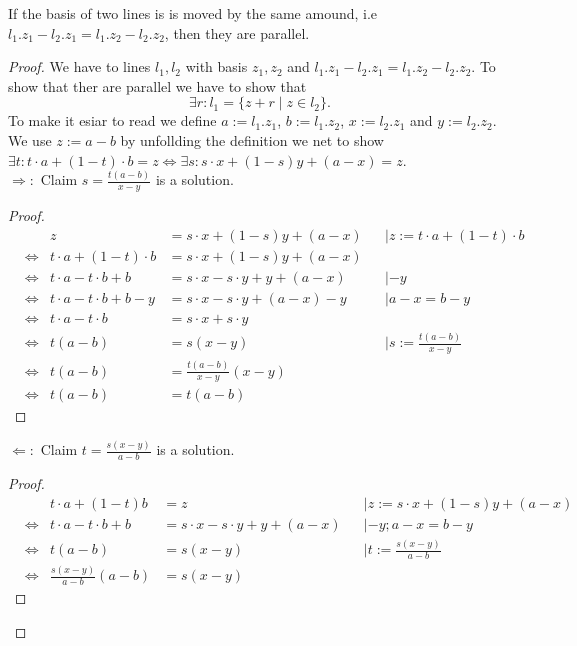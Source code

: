 \begin{lemma}
    \label{lem:parallel_by_basis}
    \leanok
   If the basis of two lines is is moved by the same amound, i.e $l_1.z_1 - l_2.z_1 = l_1.z_2- l_2.z_2$, then they are parallel.
\end{lemma}
\begin{proof}
    We have to lines $l_1, l_2$ with basis $z_1, z_2$ and $l_1.z_1 - l_2.z_1 = l_1.z_2- l_2.z_2$. To show that ther are parallel we have to show that $$\exists r: l_1 = \{z + r \mid z\in l_2\}.$$
    To make it esiar to read we define $a := l_1.z_1$, $b:= l_1.z_2$, $x:= l_2.z_1$ and $y:= l_2.z_2$.\\
    We use $z:= a - b$ by unfollding the definition we net to show $\exists t: t \cdot a +(1-t)\cdot b=z \iff \exists s :s \cdot x+(1-s)y+(a-x)=z$.\\
    $\Rightarrow:$ Claim $s = \frac{t(a-b)}{x-y}$ is a solution.\\
    \begin{proof}
    \begin{align*}
        && z &= s \cdot x+(1-s)y+(a-x)&&| z:= t\cdot a+(1-t)\cdot b\\
        &\Leftrightarrow & t\cdot a+(1-t)\cdot b  &= s \cdot x+(1-s)y+(a-x)\\
        &\Leftrightarrow & t\cdot a-t\cdot b +b &= s \cdot x-s\cdot y + y+(a-x)&& | -y\\
        &\Leftrightarrow & t\cdot a-t\cdot b + b-y  &= s \cdot x-s\cdot y+(a-x)-y&&| a-x =b-y\\
        &\Leftrightarrow & t\cdot a-t\cdot b  &= s \cdot x+s\cdot y\\
        &\Leftrightarrow & t(a-b)  &= s(x-y)&&|s:= \frac{t(a-b)}{x-y}\\
        &\Leftrightarrow & t(a-b)  &= \frac{t(a-b)}{x-y}(x-y)\\
        &\Leftrightarrow & t(a-b)  &= t(a-b)
    \end{align*}
    \end{proof}
    $\Leftarrow:$ Claim $t = \frac{s(x-y)}{a-b}$ is a solution.
    \begin{proof}
    \begin{align*}
        && t\cdot a+(1-t)b &= z&&| z:= s \cdot x+(1-s)y+(a-x)\\
        &\Leftrightarrow& t\cdot a-t\cdot b+b &= s \cdot x-s\cdot y+y+(a-x)&&|-y;a-x =b-y\\
        &\Leftrightarrow& t(a-b) &= s(x-y)&&|t:= \frac{s(x-y)}{a-b}\\
        &\Leftrightarrow& \frac{s(x-y)}{a-b}(a-b) &= s(x-y)
    \end{align*}
    \end{proof}
\end{proof}

